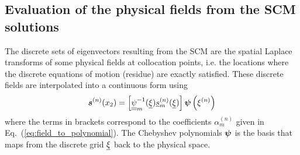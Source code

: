 \subsection{Evaluation of the physical fields from the SCM solutions}
\label{app:fields}

The discrete sets of eigenvectors resulting from the SCM are the spatial Laplace transforms of some physical fields at collocation points, i.e. the locations where the discrete equations of motion (residue) are exactly satisfied. These discrete fields are interpolated into a continuous form using
\begin{equation}
    \boldsymbol s^{(n)}(x_2) = \left[\underline{\underline{\psi}}_m^{-1}(\underline{\xi})  \underline{s}_m^{(n)}(\underline{\xi}) \right] \boldsymbol \psi\left( \xi^{(n)} \right)
    \label{eq:reinterpolation}
\end{equation}
where the terms in brackets correspond to the coefficients $\alpha^{(n)}_m$ given in Eq.~(\ref{eq:field_to_polynomial}). The Chebyshev polynomials $\boldsymbol \psi$ is the basis that maps from the discrete grid $\underline{\xi}$ back to the physical space. 

